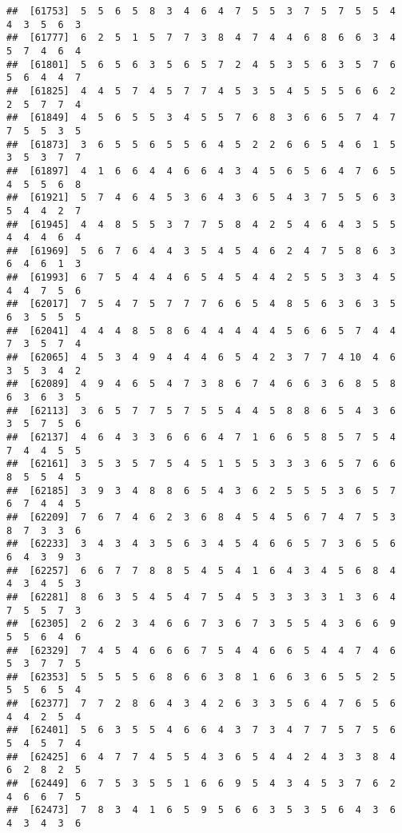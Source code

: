 \documentclass[
]{book}
\begin{document}
\begin{verbatim}
##  [61753]  5  5  6  5  8  3  4  6  4  7  5  5  3  7  5  7  5  5  4  4  3  5  6  3
##  [61777]  6  2  5  1  5  7  7  3  8  4  7  4  4  6  8  6  6  3  4  5  7  4  6  4
##  [61801]  5  6  5  6  3  5  6  5  7  2  4  5  3  5  6  3  5  7  6  5  6  4  4  7
##  [61825]  4  4  5  7  4  5  7  7  4  5  3  5  4  5  5  5  6  6  2  2  5  7  7  4
##  [61849]  4  5  6  5  5  3  4  5  5  7  6  8  3  6  6  5  7  4  7  7  5  5  3  5
##  [61873]  3  6  5  5  6  5  5  6  4  5  2  2  6  6  5  4  6  1  5  3  5  3  7  7
##  [61897]  4  1  6  6  4  4  6  6  4  3  4  5  6  5  6  4  7  6  5  4  5  5  6  8
##  [61921]  5  7  4  6  4  5  3  6  4  3  6  5  4  3  7  5  5  6  3  5  4  4  2  7
##  [61945]  4  4  8  5  5  3  7  7  5  8  4  2  5  4  6  4  3  5  5  4  4  4  6  4
##  [61969]  5  6  7  6  4  4  3  5  4  5  4  6  2  4  7  5  8  6  3  6  4  6  1  3
##  [61993]  6  7  5  4  4  4  6  5  4  5  4  4  2  5  5  3  3  4  5  4  4  7  5  6
##  [62017]  7  5  4  7  5  7  7  7  6  6  5  4  8  5  6  3  6  3  5  6  3  5  5  5
##  [62041]  4  4  4  8  5  8  6  4  4  4  4  4  5  6  6  5  7  4  4  7  3  5  7  4
##  [62065]  4  5  3  4  9  4  4  4  6  5  4  2  3  7  7  4 10  4  6  3  5  3  4  2
##  [62089]  4  9  4  6  5  4  7  3  8  6  7  4  6  6  3  6  8  5  8  6  3  6  3  5
##  [62113]  3  6  5  7  7  5  7  5  5  4  4  5  8  8  6  5  4  3  6  3  5  7  5  6
##  [62137]  4  6  4  3  3  6  6  6  4  7  1  6  6  5  8  5  7  5  4  7  4  4  5  5
##  [62161]  3  5  3  5  7  5  4  5  1  5  5  3  3  3  6  5  7  6  6  8  5  5  4  5
##  [62185]  3  9  3  4  8  8  6  5  4  3  6  2  5  5  5  3  6  5  7  6  7  4  4  5
##  [62209]  7  6  7  4  6  2  3  6  8  4  5  4  5  6  7  4  7  5  3  8  7  3  3  6
##  [62233]  3  4  3  4  3  5  6  3  4  5  4  6  6  5  7  3  6  5  6  6  4  3  9  3
##  [62257]  6  6  7  7  8  8  5  4  5  4  1  6  4  3  4  5  6  8  4  4  3  4  5  3
##  [62281]  8  6  3  5  4  5  4  7  5  4  5  3  3  3  3  1  3  6  4  7  5  5  7  3
##  [62305]  2  6  2  3  4  6  6  7  3  6  7  3  5  5  4  3  6  6  9  5  5  6  4  6
##  [62329]  7  4  5  4  6  6  6  7  5  4  4  6  6  5  4  4  7  4  6  5  3  7  7  5
##  [62353]  5  5  5  5  6  8  6  6  3  8  1  6  6  3  6  5  5  2  5  5  5  6  5  4
##  [62377]  7  7  2  8  6  4  3  4  2  6  3  3  5  6  4  7  6  5  6  4  4  2  5  4
##  [62401]  5  6  3  5  5  4  6  6  4  3  7  3  4  7  7  5  7  5  6  5  4  5  7  4
##  [62425]  6  4  7  7  4  5  5  4  3  6  5  4  4  2  4  3  3  8  4  6  2  8  2  5
##  [62449]  6  7  5  3  5  5  1  6  6  9  5  4  3  4  5  3  7  6  2  4  6  6  7  5
##  [62473]  7  8  3  4  1  6  5  9  5  6  6  3  5  3  5  6  4  3  6  4  3  4  3  6

\end{verbatim}
\end{document}
